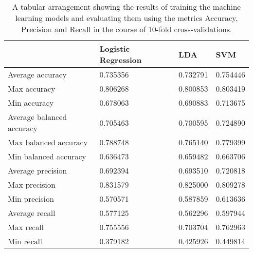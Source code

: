 \documentclass[../masterarbeit.tex]{subfiles}
\begin{document}
\begin{table}[!ht]
    \centering
    \begin{tabular}{|l|l|l|l|}
    \hline
         & Logistic Regression & LDA & SVM \\ \hline
        Average accuracy & 0.735356 & 0.732791 & 0.754446 \\ \hline
        Max accuracy & 0.806268 & 0.800853 & 0.803419 \\ \hline
        Min accuracy & 0.678063 & 0.690883 & 0.713675 \\ \hline
        Average balanced accuracy & 0.705463 & 0.700595 & 0.724890 \\ \hline
        Max balanced accuracy & 0.788748 & 0.765140 & 0.779399 \\ \hline
        Min balanced accuracy & 0.636473 & 0.659482 & 0.663706 \\ \hline
        Average precision & 0.692394 & 0.693510 & 0.720818 \\ \hline
        Max precision & 0.831579 & 0.825000 & 0.809278 \\ \hline
        Min precision & 0.570571 & 0.587859 & 0.613636 \\ \hline
        Average recall & 0.577125 & 0.562296 & 0.597944 \\ \hline
        Max recall & 0.755556 & 0.703704 & 0.762963 \\ \hline
        Min recall & 0.379182 & 0.425926 & 0.449814 \\ \hline
    \end{tabular}
    \caption{A tabular arrangement showing the results of training the machine learning models and evaluating them using the metrics Accuracy, Precision and Recall in the course of 10-fold cross-validations.}
\end{table}
\end{document}
